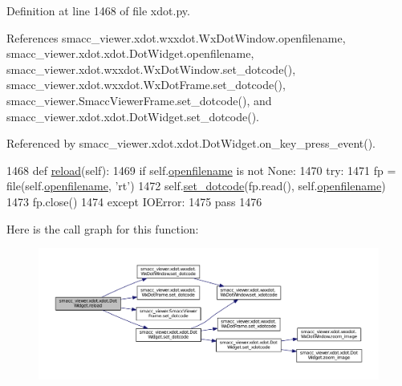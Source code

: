 Definition at line 1468 of file xdot.\+py.



References smacc\+\_\+viewer.\+xdot.\+wxxdot.\+Wx\+Dot\+Window.\+openfilename, smacc\+\_\+viewer.\+xdot.\+xdot.\+Dot\+Widget.\+openfilename, smacc\+\_\+viewer.\+xdot.\+wxxdot.\+Wx\+Dot\+Window.\+set\+\_\+dotcode(), smacc\+\_\+viewer.\+xdot.\+wxxdot.\+Wx\+Dot\+Frame.\+set\+\_\+dotcode(), smacc\+\_\+viewer.\+Smacc\+Viewer\+Frame.\+set\+\_\+dotcode(), and smacc\+\_\+viewer.\+xdot.\+xdot.\+Dot\+Widget.\+set\+\_\+dotcode().



Referenced by smacc\+\_\+viewer.\+xdot.\+xdot.\+Dot\+Widget.\+on\+\_\+key\+\_\+press\+\_\+event().


\begin{DoxyCode}
1468     \textcolor{keyword}{def }\hyperlink{classsmacc__viewer_1_1xdot_1_1xdot_1_1DotWidget_ad65916bccc16b7a559ced00059d1f256}{reload}(self):
1469         \textcolor{keywordflow}{if} self.\hyperlink{classsmacc__viewer_1_1xdot_1_1xdot_1_1DotWidget_a4698d9416255a0026e38a545f6c0ec5f}{openfilename} \textcolor{keywordflow}{is} \textcolor{keywordflow}{not} \textcolor{keywordtype}{None}:
1470             \textcolor{keywordflow}{try}:
1471                 fp = file(self.\hyperlink{classsmacc__viewer_1_1xdot_1_1xdot_1_1DotWidget_a4698d9416255a0026e38a545f6c0ec5f}{openfilename}, \textcolor{stringliteral}{'rt'})
1472                 self.\hyperlink{classsmacc__viewer_1_1xdot_1_1xdot_1_1DotWidget_ab824941e96366c2317bae9ae050c222f}{set\_dotcode}(fp.read(), self.\hyperlink{classsmacc__viewer_1_1xdot_1_1xdot_1_1DotWidget_a4698d9416255a0026e38a545f6c0ec5f}{openfilename})
1473                 fp.close()
1474             \textcolor{keywordflow}{except} IOError:
1475                 \textcolor{keywordflow}{pass}
1476 
\end{DoxyCode}


Here is the call graph for this function\+:
\nopagebreak
\begin{figure}[H]
\begin{center}
\leavevmode
\includegraphics[width=350pt]{classsmacc__viewer_1_1xdot_1_1xdot_1_1DotWidget_ad65916bccc16b7a559ced00059d1f256_cgraph}
\end{center}
\end{figure}




